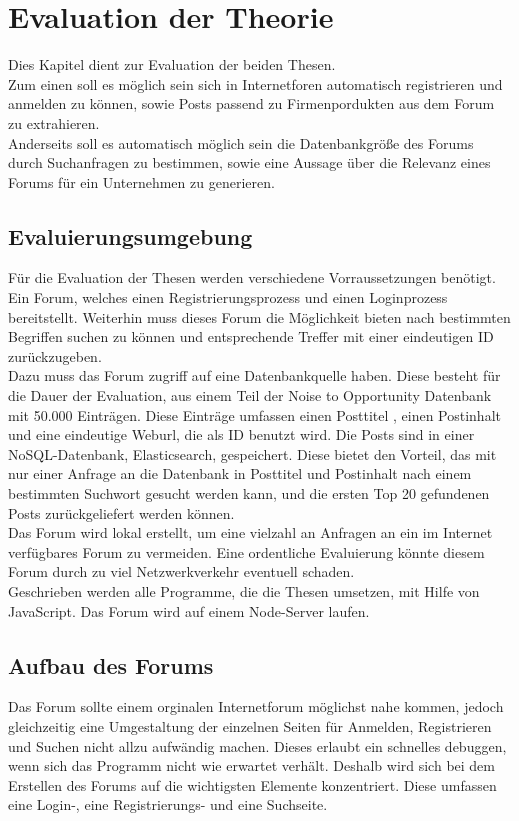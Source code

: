 \section{Evaluation der Theorie}
Dies Kapitel dient zur Evaluation der beiden Thesen.\\
Zum einen soll es möglich sein sich in Internetforen automatisch registrieren und anmelden zu können, sowie Posts passend zu Firmenpordukten aus dem Forum zu extrahieren.\\
Anderseits soll es automatisch möglich sein die Datenbankgröße des Forums durch Suchanfragen zu bestimmen, sowie eine Aussage über die Relevanz eines Forums für ein Unternehmen zu generieren.
\subsection{Evaluierungsumgebung}
Für die Evaluation der Thesen werden verschiedene Vorraussetzungen benötigt. Ein Forum, welches einen Registrierungsprozess und einen Loginprozess bereitstellt. Weiterhin muss dieses Forum die Möglichkeit bieten nach bestimmten Begriffen suchen zu können und entsprechende Treffer mit einer eindeutigen ID zurückzugeben.\\
Dazu muss das Forum zugriff auf eine Datenbankquelle haben. Diese besteht für die Dauer der Evaluation, aus einem Teil der Noise to Opportunity Datenbank mit 50.000 Einträgen. Diese Einträge umfassen einen Posttitel , einen Postinhalt und eine eindeutige Weburl, die als ID benutzt wird. Die Posts sind in einer NoSQL-Datenbank, Elasticsearch, gespeichert. Diese bietet den Vorteil, das mit nur einer Anfrage an die Datenbank in Posttitel und Postinhalt nach einem bestimmten Suchwort gesucht werden kann, und die ersten Top 20 gefundenen Posts zurückgeliefert werden können.\\
Das Forum wird lokal erstellt, um eine vielzahl an Anfragen an ein im Internet verfügbares Forum zu vermeiden. Eine ordentliche Evaluierung könnte diesem Forum durch zu viel Netzwerkverkehr eventuell schaden.\\
Geschrieben werden alle Programme, die die Thesen umsetzen, mit Hilfe von JavaScript. Das Forum wird auf einem Node-Server laufen. 
\subsection{Aufbau des Forums}
Das Forum sollte einem orginalen Internetforum möglichst nahe kommen, jedoch gleichzeitig eine Umgestaltung der einzelnen Seiten für Anmelden, Registrieren und Suchen nicht allzu aufwändig machen. Dieses erlaubt ein schnelles debuggen, wenn sich das Programm nicht wie erwartet verhält. Deshalb wird sich bei dem Erstellen des Forums auf die wichtigsten Elemente konzentriert. Diese umfassen eine Login-, eine Registrierungs- und eine Suchseite.
